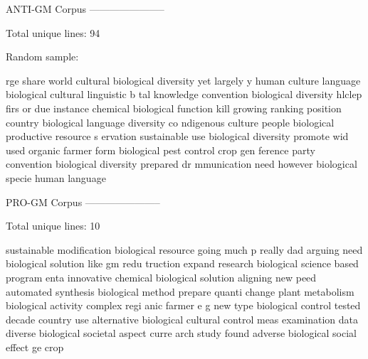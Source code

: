 \begin{footnotesize}

ANTI-GM Corpus\newline
-----------------------

Total unique lines: 94

Random sample:

rge share world cultural biological diversity yet largely\newline
y human culture language biological cultural linguistic b\newline
tal knowledge convention biological diversity hlclep firs\newline
or due instance chemical biological function kill growing\newline
ranking position country biological language diversity co\newline
ndigenous culture people biological productive resource s\newline
ervation sustainable use biological diversity promote wid\newline
used organic farmer form biological pest control crop gen\newline
ference party convention biological diversity prepared dr\newline
mmunication need however biological specie human language

PRO-GM Corpus\newline
-----------------------

Total unique lines: 10

sustainable modification biological resource going much p\newline
 really dad arguing need biological solution like gm redu\newline
truction expand research biological science based program\newline
enta innovative chemical biological solution aligning new\newline
peed automated synthesis biological method prepare quanti\newline
 change plant metabolism biological activity complex regi\newline
anic farmer e g new type biological control tested decade\newline
 country use alternative biological cultural control meas\newline
examination data diverse biological societal aspect curre\newline
arch study found adverse biological social effect ge crop
\end{footnotesize}

